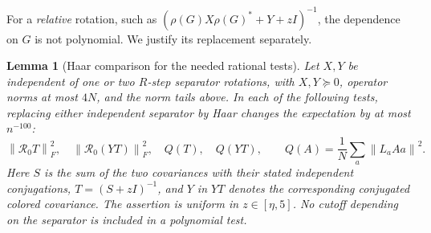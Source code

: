 \documentclass[11pt]{article}
\newtheorem{lemma}[theorem]{Lemma}
\theoremstyle{definition}\newtheorem{definition}[theorem]{Definition}
\theoremstyle{remark}\newtheorem{remark}[theorem]{Remark}
\newcommand{\R}{\mathcal R}
\newcommand{\norm}[1]{\left\lVert#1\right\rVert}
\begin{document}
For a \emph{relative} rotation, such as $(\rho(G)X\rho(G)^*+Y+zI)^{-1}$, the dependence on $G$ is not polynomial. We justify its replacement separately.

\begin{lemma}[Haar comparison for the needed rational tests]\label{lem:rational-comparison}
Let $X,Y$ be independent of one or two $R$-step separator rotations, with $X,Y\succeq0$, operator norms at most $4N$, and the norm tails above. In each of the following tests, replacing either independent separator by Haar changes the expectation by at most $n^{-100}$:
\[
 \norm{\R_0 T}_F^2,\quad \norm{\R_0(YT)}_F^2,\quad
 Q(T),\quad Q(YT),\qquad
 Q(A)=\frac1N\sum_a\norm{L_aAa}^2.
\]
Here $S$ is the sum of the two covariances with their stated independent conjugations, $T=(S+zI)^{-1}$, and $Y$ in $YT$ denotes the corresponding conjugated colored covariance. The assertion is uniform in $z\in[\eta,5]$. No cutoff depending on the separator is included in a polynomial test.
\end{lemma}
\end{document}
